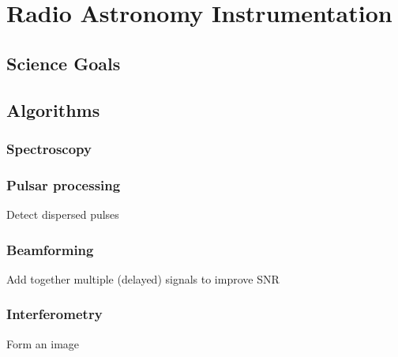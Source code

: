 \chapter{Radio Astronomy Instrumentation}

\section{Science Goals}
\section{Algorithms}
\subsection{Spectroscopy}
\subsection{Pulsar processing}
Detect dispersed pulses
\subsection{Beamforming}
Add together multiple (delayed) signals to improve SNR
\subsection{Interferometry}
Form an image
